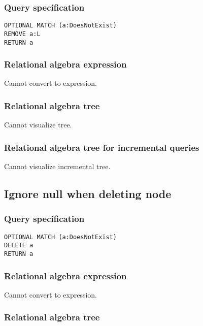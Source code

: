 \subsubsection*{Query specification}

\begin{lstlisting}
OPTIONAL MATCH (a:DoesNotExist)
REMOVE a:L
RETURN a
\end{lstlisting}

\subsubsection*{Relational algebra expression}

Cannot convert to expression.

\subsubsection*{Relational algebra tree}

Cannot visualize tree.

\subsubsection*{Relational algebra tree for incremental queries}

Cannot visualize incremental tree.

\subsection{Ignore null when deleting node}

\subsubsection*{Query specification}

\begin{lstlisting}
OPTIONAL MATCH (a:DoesNotExist)
DELETE a
RETURN a
\end{lstlisting}

\subsubsection*{Relational algebra expression}

Cannot convert to expression.

\subsubsection*{Relational algebra tree}

